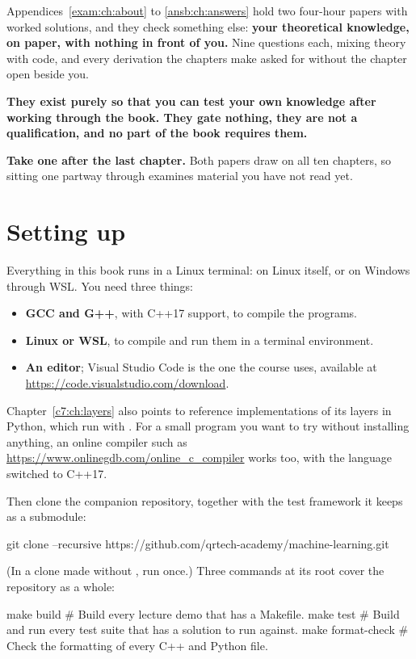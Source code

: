 Appendices~\ref{exam:ch:about} to \ref{ansb:ch:answers} hold two four-hour papers with worked
solutions, and they check something else: \textbf{your theoretical knowledge, on paper, with
nothing in front of you.} Nine questions each, mixing theory with code, and every derivation the
chapters make asked for without the chapter open beside you.

\textbf{They exist purely so that you can test your own knowledge after working through the book.
They gate nothing, they are not a qualification, and no part of the book requires them.}

\textbf{Take one after the last chapter.} Both papers draw on all ten chapters, so sitting one
partway through examines material you have not read yet.

\section*{Setting up}
Everything in this book runs in a Linux terminal: on Linux itself, or on Windows through WSL. You
need three things:
\begin{itemize}
  \item \textbf{GCC and G++}, with C++17 support, to compile the programs.
  \item \textbf{Linux or WSL}, to compile and run them in a terminal environment.
  \item \textbf{An editor}; Visual Studio Code is the one the course uses, available at
    \url{https://code.visualstudio.com/download}.
\end{itemize}
Chapter~\ref{c7:ch:layers} also points to reference implementations of its layers in Python, which
run with . For a small program you want to try without installing anything, an online
compiler such as \url{https://www.onlinegdb.com/online_c_compiler} works too, with the language
switched to C++17.

Then clone the companion repository, together with the test framework it keeps as a submodule:

\begin{shell}
git clone --recursive https://github.com/qrtech-academy/machine-learning.git
\end{shell}

\noindent (In a clone made without , run 
once.) Three commands at its root cover the repository as a whole:

\begin{shell}
make build               # Build every lecture demo that has a Makefile.
make test                # Build and run every test suite that has a solution to run against.
make format-check        # Check the formatting of every C++ and Python file.
\end{shell}

